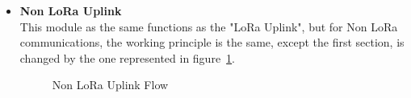 \begin{itemize}
   \item \textbf{Non LoRa Uplink} \\
    This module as the same functions as the "LoRa Uplink", but for Non LoRa communications, the working principle is the same, except the first section, is changed by the one represented in figure~\ref{fig:Non_LoRA_Up}.
    
    \begin{figure}[htbp]
      
      \centering
      \caption{Non LoRa Uplink Flow}
      \label{fig:Non_LoRA_Up}
    \end{figure}

\end{itemize}

